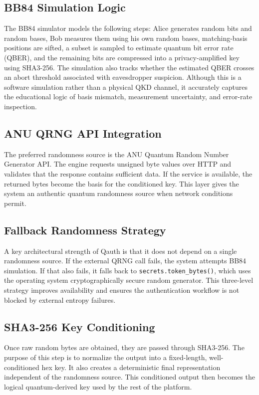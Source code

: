 \documentclass[12pt,a4paper]{report}
\begin{document}
\subsection{BB84 Simulation Logic}
The BB84 simulator models the following steps: Alice generates random bits and random bases, Bob measures them using his own random bases, matching-basis positions are sifted, a subset is sampled to estimate quantum bit error rate (QBER), and the remaining bits are compressed into a privacy-amplified key using SHA3-256. The simulation also tracks whether the estimated QBER crosses an abort threshold associated with eavesdropper suspicion. Although this is a software simulation rather than a physical QKD channel, it accurately captures the educational logic of basis mismatch, measurement uncertainty, and error-rate inspection.

\subsection{ANU QRNG API Integration}
The preferred randomness source is the ANU Quantum Random Number Generator API. The engine requests unsigned byte values over HTTP and validates that the response contains sufficient data. If the service is available, the returned bytes become the basis for the conditioned key. This layer gives the system an authentic quantum randomness source when network conditions permit.

\subsection{Fallback Randomness Strategy}
A key architectural strength of Qauth is that it does not depend on a single randomness source. If the external QRNG call fails, the system attempts BB84 simulation. If that also fails, it falls back to \texttt{secrets.token\_bytes()}, which uses the operating system cryptographically secure random generator. This three-level strategy improves availability and ensures the authentication workflow is not blocked by external entropy failures.

\subsection{SHA3-256 Key Conditioning}
Once raw random bytes are obtained, they are passed through SHA3-256. The purpose of this step is to normalize the output into a fixed-length, well-conditioned hex key. It also creates a deterministic final representation independent of the randomness source. This conditioned output then becomes the logical quantum-derived key used by the rest of the platform.
\end{document}

